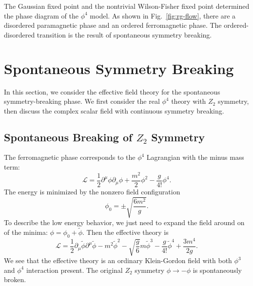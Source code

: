 \documentclass[aps,prb,superscriptaddress,nofootinbib]{revtex4}
\begin{document}
The Gaussian fixed point and the nontrivial Wilson-Fisher fixed point determined the phase diagram of the $\phi^4$ model.
As shown in Fig.~\ref{fig:rg-flow}, there are a disordered paramagnetic phase and an ordered ferromagnetic phase.
The ordered-disordered transition is the result of spontaneous symmetry breaking.




\section{Spontaneous Symmetry Breaking}

In this section, we consider the effective field theory for the spontaneous symmetry-breaking phase.
We first consider the real $\phi^4$ theory with $Z_2$ symmetry, then discuss the complex scalar field with continuous symmetry breaking.

\subsection{Spontaneous Breaking of $Z_2$ Symmetry}
The ferromagnetic phase corresponds to the $\phi^4$ Lagrangian with the minus mass term:
\begin{equation}
	\mathcal L =\frac{1}{2}\partial^\mu \phi \partial_\mu \phi +\frac{m^2}{2}\phi^2 - \frac{g}{4!}\phi^4.
\end{equation}
The energy is minimized by the nonzero field configuration
\begin{equation}
	\phi_0 = \pm \sqrt{\frac{6m^2}{g}}.
\end{equation}
To describe the low energy behavior, we just need to expand the field around on of the minima: $\phi = \phi_0 +\tilde\phi$.
Then the effective theory is
\begin{equation}
	\mathcal{L}=\frac{1}{2} \partial_{\mu} \tilde{\phi}\partial^{\mu} \tilde{\phi} -m^{2} \tilde{\phi}^{2}-\sqrt{\frac{g}{6}} m \tilde{\phi}^{3}-\frac{g}{4 !} \tilde{\phi}^{4}+\frac{3 m^{4}}{2 g}.
\end{equation}
We see that the effective theory is an ordinary Klein-Gordon field with both $\phi^3$ and $\phi^4$ interaction present.
The original $Z_2$ symmetry $\phi \rightarrow -\phi$ is spontaneously broken. 
\end{document}
